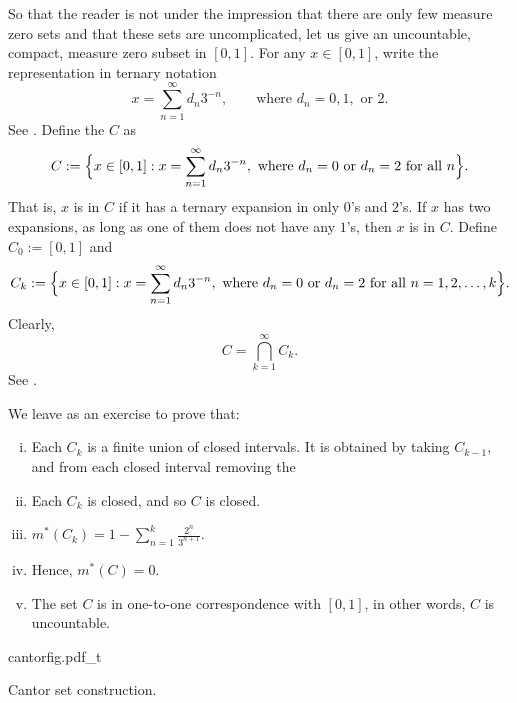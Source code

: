 \begin{example} \label{example:cantor}
So that the reader is not under the impression that there are only few
measure zero sets and that these sets are uncomplicated,
let us give an uncountable, compact, measure zero subset in $[0,1]$.
For any $x \in [0,1]$, write the
representation in ternary notation
\begin{equation*}
x = \sum_{n=1}^\infty d_n 3^{-n} ,
\qquad \text{where } d_n=0, 1, \text{ or } 2.
\end{equation*}
See .
Define the \emph{} $C$ as
\begin{equation*}
C := \Bigl\{ x \in [0,1] : x = \sum_{n=1}^\infty d_n 3^{-n},
\text{ where } d_n = 0 \text{ or } d_n = 2 \text{ for all } n \Bigr\} .
\end{equation*}
That is, $x$ is in $C$ if it has a ternary expansion in only $0$'s and
$2$'s.  If $x$ has two expansions, as long as one of them does not have any
$1$'s, then $x$ is in $C$.
Define $C_0 := [0,1]$ and
\begin{equation*}
C_k := \Bigl\{ x \in [0,1] : x = \sum_{n=1}^\infty d_n 3^{-n},
\text{ where } d_n = 0 \text{ or } d_n = 2 \text{ for all } n=1,2,\ldots,k \Bigr\} .
\end{equation*}
Clearly,
\begin{equation*}
C = \bigcap_{k=1}^\infty C_k .
\end{equation*}
See .

We leave as an exercise to prove that:
\begin{enumerate}[(i)]
\item Each $C_k$ is a finite union of closed intervals.  It is obtained by
taking $C_{k-1}$, and from each closed interval removing the
\item Each $C_k$ is closed, and so $C$ is closed.
\item 
$m^*(C_k) =1 - \sum_{n=1}^k \frac{2^n}{3^{n+1}}$.
\item Hence,
$m^*(C) = 0$.
\item The set $C$ is in one-to-one correspondence with $[0,1]$, in other
words, $C$ is
uncountable.
\end{enumerate}
\begin{myfigureht}
{cantorfig.pdf_t}
\caption{Cantor set construction.\label{fig:cantor}}
\end{myfigureht}
\end{example}


